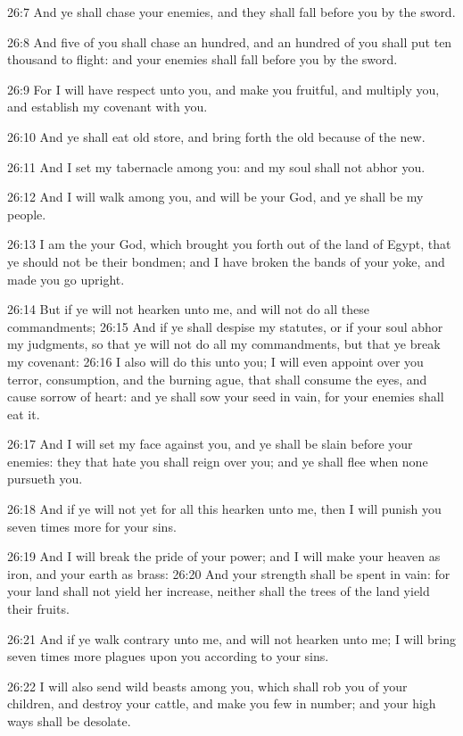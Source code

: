 26:7 And ye shall chase your enemies, and they shall fall before you
by the sword.

26:8 And five of you shall chase an hundred, and an hundred of you
shall put ten thousand to flight: and your enemies shall fall before
you by the sword.

26:9 For I will have respect unto you, and make you fruitful, and
multiply you, and establish my covenant with you.

26:10 And ye shall eat old store, and bring forth the old because of
the new.

26:11 And I set my tabernacle among you: and my soul shall not abhor
you.

26:12 And I will walk among you, and will be your God, and ye shall be
my people.

26:13 I am the \LORD your God, which brought you forth out of the land
of Egypt, that ye should not be their bondmen; and I have broken the
bands of your yoke, and made you go upright.

26:14 But if ye will not hearken unto me, and will not do all these
commandments; 26:15 And if ye shall despise my statutes, or if your
soul abhor my judgments, so that ye will not do all my commandments,
but that ye break my covenant: 26:16 I also will do this unto you; I
will even appoint over you terror, consumption, and the burning ague,
that shall consume the eyes, and cause sorrow of heart: and ye shall
sow your seed in vain, for your enemies shall eat it.

26:17 And I will set my face against you, and ye shall be slain before
your enemies: they that hate you shall reign over you; and ye shall
flee when none pursueth you.

26:18 And if ye will not yet for all this hearken unto me, then I will
punish you seven times more for your sins.

26:19 And I will break the pride of your power; and I will make your
heaven as iron, and your earth as brass: 26:20 And your strength shall
be spent in vain: for your land shall not yield her increase, neither
shall the trees of the land yield their fruits.

26:21 And if ye walk contrary unto me, and will not hearken unto me; I
will bring seven times more plagues upon you according to your sins.

26:22 I will also send wild beasts among you, which shall rob you of
your children, and destroy your cattle, and make you few in number;
and your high ways shall be desolate.

